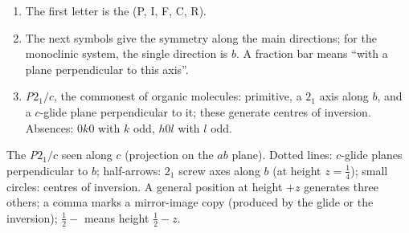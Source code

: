 \begin{method}\label{met:b3:x-ray-diffraction:read-space-group}
\begin{enumerate}
  \item The first letter is the  (P, I, F, C, R).
  \item The next symbols give the symmetry along the main directions; for the
        monoclinic system, the single direction is $b$. A fraction bar means
        ``with a plane perpendicular to this axis''.
  \item \textit{P}$2_1/c$, the commonest  of organic molecules: primitive,
        a $2_1$ axis along $b$, and a $c$-glide plane perpendicular to it; these
        generate centres of inversion. Absences: $0k0$ with $k$ odd, $h0l$ with $l$
        odd.
\end{enumerate}
\end{method}

\begin{omfigure}

{\small The  \textit{P}$2_1/c$ seen along $c$ (projection on the $ab$ plane).
Dotted lines: $c$-glide planes perpendicular to $b$; half-arrows: $2_1$ screw axes
along $b$ (at height $z = \frac14$); small circles: centres of inversion. A general
position at height $+z$ generates three others; a comma marks a mirror-image
copy (produced by the glide or the inversion); $\frac12{-}$ means height $\frac12 - z$.}
\end{omfigure}

